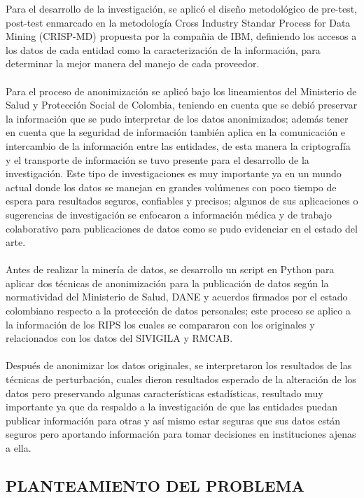 \documentclass[a4paper,openright,12pt]{book}
\theoremstyle{definition}
\theoremstyle{remark}
\begin{document}
Para el desarrollo de la investigación, se aplicó el diseño metodológico de pre-test, post-test enmarcado en la metodología Cross Industry Standar Process for Data Mining (CRISP-MD) propuesta por la compañia de IBM, definiendo los accesos a los datos de cada entidad como la caracterización de la información, para determinar la mejor manera del manejo de cada proveedor.\\\\Para el proceso de anonimización se aplicó bajo los lineamientos del Ministerio de Salud y Protección Social de Colombia, teniendo en cuenta que se debió preservar la información que se pudo interpretar de los datos anonimizados; además tener en cuenta que la seguridad de información también aplica en la comunicación e intercambio de la información entre las entidades, de esta manera la criptografía y el transporte de información se tuvo presente para el desarrollo de la investigación. Este tipo de investigaciones es muy importante ya en un mundo actual donde los datos se manejan en grandes volúmenes con poco tiempo de espera para resultados seguros, confiables y precisos; algunos de sus aplicaciones o sugerencias de investigación se enfocaron a información médica y de trabajo colaborativo para publicaciones de datos como se pudo evidenciar en el estado del arte.\\\\ Antes de realizar la minería de datos, se desarrollo un script en Python para aplicar dos técnicas de anonimización para la publicación de datos según la normatividad del Ministerio de Salud, DANE y acuerdos firmados por el estado colombiano respecto a la protección de datos personales; este proceso se aplico a la información de los RIPS los cuales se compararon con los originales y relacionados con los datos del SIVIGILA y RMCAB.\\\\Después de anonimizar los datos originales, se interpretaron los resultados de las técnicas de perturbación, cuales dieron resultados esperado de la alteración de los datos pero preservando algunas características estadísticas, resultado muy importante ya que da respaldo a la investigación de que las entidades puedan publicar información para otras y así mismo estar seguras que sus datos están seguros pero aportando información para tomar decisiones en instituciones ajenas a ella.
 \clearpage

\begin{center}
 \chapter{PLANTEAMIENTO DEL PROBLEMA}\label{cap.planteamiento}
 \end{center}
 
\end{document}
